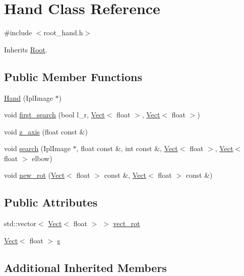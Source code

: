 \hypertarget{class_hand}{\section{Hand Class Reference}
\label{class_hand}
}


{\ttfamily \#include $<$root\+\_\+hand.\+h$>$}



Inherits \hyperlink{class_root}{Root}.

\subsection*{Public Member Functions}
\begin{DoxyCompactItemize}
\item 
\hyperlink{class_hand_a59407f12d34f8e084cd97487e8987495}{Hand} (Ipl\+Image $\ast$)
\item 
void \hyperlink{class_hand_a06cfdc73d7408e9e7789d689f04ceb4f}{first\+\_\+search} (bool l\+\_\+r, \hyperlink{class_vect}{Vect}$<$ float $>$, \hyperlink{class_vect}{Vect}$<$ float $>$)
\item 
void \hyperlink{class_hand_a1cefbe10b5e368ee180186f609054a07}{z\+\_\+axis} (float const \&)
\item 
void \hyperlink{class_hand_a327a5da7f91483bea155a517825e7b2d}{search} (Ipl\+Image $\ast$, float const \&, int const \&, \hyperlink{class_vect}{Vect}$<$ float $>$, \hyperlink{class_vect}{Vect}$<$ float $>$ elbow)
\item 
void \hyperlink{class_hand_ab42830e09db098ac05caa2516ddbd271}{new\+\_\+rot} (\hyperlink{class_vect}{Vect}$<$ float $>$ const \&, \hyperlink{class_vect}{Vect}$<$ float $>$ const \&)
\end{DoxyCompactItemize}
\subsection*{Public Attributes}
\begin{DoxyCompactItemize}
\item 
std\+::vector$<$ \hyperlink{class_vect}{Vect}$<$ float $>$ $>$ \hyperlink{class_hand_aee89f8228c4b91d6b945cfd0ac06a1f4}{vect\+\_\+rot}
\item 
\hyperlink{class_vect}{Vect}$<$ float $>$ \hyperlink{class_hand_adff0a0b12313a9c91d199fe1f254d7af}{s}
\end{DoxyCompactItemize}
\subsection*{Additional Inherited Members}


